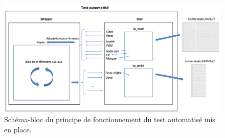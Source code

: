 \documentclass[oneside]{book}
\begin{document}
\newpage

\begin{figure}[htbp]
    \hspace{-1cm}
    \includegraphics[scale=0.7]{image/test_autom}
    \caption{Schéma-bloc du principe de fonctionnement du test automatisé mis en place.}
    \label{fig:test_autom} 
\end{figure}
\end{document}
